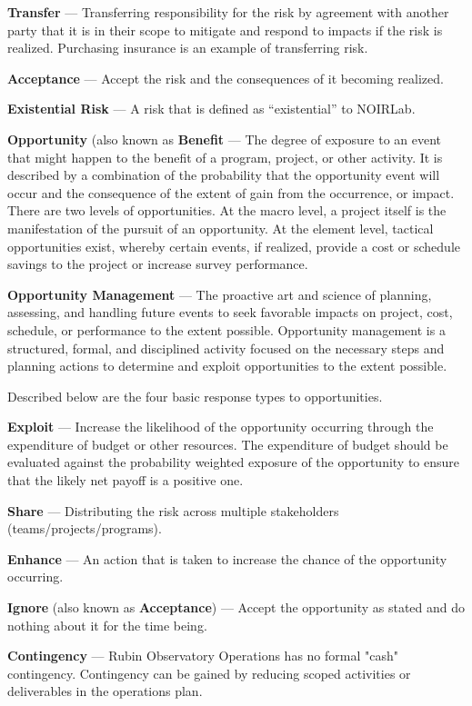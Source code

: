\textbf{Transfer} ---
Transferring responsibility for the risk by agreement with another party that it is in their scope to mitigate and respond to impacts if the risk is realized. Purchasing insurance is an example of transferring risk.

\textbf{Acceptance} ---
Accept the risk and the consequences of it becoming realized.

\textbf{Existential Risk} ---
A risk that is defined as ``existential'' to NOIRLab.

\textbf{Opportunity} (also known as \textbf{Benefit} ---
The degree of exposure to an event that might happen to the benefit of a program, project, or other activity.
It is described by a combination of the probability that the opportunity event will occur and the consequence of the extent of gain from the occurrence, or impact.
There are two levels of opportunities. At the macro level, a project itself is the manifestation of the pursuit of an opportunity.
At the element level, tactical opportunities exist, whereby certain events, if realized, provide a cost or schedule savings to the project or increase survey performance.

\textbf{Opportunity Management} ---
The proactive art and science of planning, assessing, and handling future events to seek favorable impacts on project, cost, schedule, or performance to the extent possible.
Opportunity management is a structured, formal, and disciplined activity focused on the necessary steps and planning actions to determine and exploit opportunities to the extent possible.

Described below are the four basic response types to opportunities.

\textbf{Exploit} ---
Increase the likelihood of the opportunity occurring through the expenditure of budget or other resources.
The expenditure of budget should be evaluated against the probability weighted exposure of the opportunity to ensure that the likely net payoff is a positive one.

\textbf{Share} ---
Distributing the risk across multiple stakeholders (teams/projects/programs).

\textbf{Enhance} ---
An action that is taken to increase the chance of the opportunity occurring.

\textbf{Ignore} (also known as \textbf{Acceptance}) ---
Accept the opportunity as stated and do nothing about it for the time being.

\textbf{Contingency} ---
Rubin Observatory Operations has no formal "cash" contingency.
Contingency can be gained by reducing scoped activities or deliverables in the operations plan.

